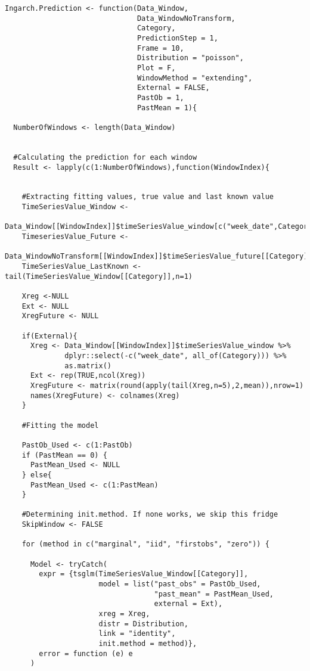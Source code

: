 \begin{verbatim}
Ingarch.Prediction <- function(Data_Window,
                               Data_WindowNoTransform,
                               Category,
                               PredictionStep = 1,
                               Frame = 10,
                               Distribution = "poisson",
                               Plot = F,
                               WindowMethod = "extending",
                               External = FALSE,
                               PastOb = 1,
                               PastMean = 1){
  
  NumberOfWindows <- length(Data_Window)
  
  
  #Calculating the prediction for each window
  Result <- lapply(c(1:NumberOfWindows),function(WindowIndex){
    
    
    #Extracting fitting values, true value and last known value
    TimeSeriesValue_Window <- 
		Data_Window[[WindowIndex]]$timeSeriesValue_window[c("week_date",Category)]
    TimeseriesValue_Future <- 
		Data_WindowNoTransform[[WindowIndex]]$timeSeriesValue_future[[Category]]
    TimeSeriesValue_LastKnown <- tail(TimeSeriesValue_Window[[Category]],n=1)
    
    Xreg <-NULL
    Ext <- NULL
    XregFuture <- NULL
    
    if(External){
      Xreg <- Data_Window[[WindowIndex]]$timeSeriesValue_window %>%
              dplyr::select(-c("week_date", all_of(Category))) %>%
              as.matrix()
      Ext <- rep(TRUE,ncol(Xreg))
      XregFuture <- matrix(round(apply(tail(Xreg,n=5),2,mean)),nrow=1)
      names(XregFuture) <- colnames(Xreg)
    }
    
    #Fitting the model
   
    PastOb_Used <- c(1:PastOb)
    if (PastMean == 0) {
      PastMean_Used <- NULL
    } else{
      PastMean_Used <- c(1:PastMean)
    }
    
    #Determining init.method. If none works, we skip this fridge 
    SkipWindow <- FALSE
    
    for (method in c("marginal", "iid", "firstobs", "zero")) {
      
      Model <- tryCatch(
        expr = {tsglm(TimeSeriesValue_Window[[Category]],
                      model = list("past_obs" = PastOb_Used,
                                   "past_mean" = PastMean_Used,
                                   external = Ext),
                      xreg = Xreg,
                      distr = Distribution,
                      link = "identity",
                      init.method = method)},
        error = function (e) e
      )
      

\end{verbatim}
